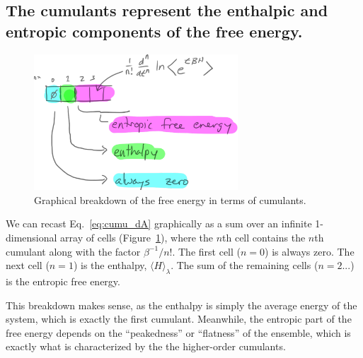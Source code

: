 \documentclass{article}
\begin{document}
\subsection{The cumulants represent the enthalpic and entropic components of the free energy.}

\begin{figure}[tb]
\centering
\includegraphics[width=3in]{figure1.pdf}
\caption{Graphical breakdown of the free energy in terms of cumulants.}
\label{fig:1D}
\end{figure}

We can recast Eq.~\ref{eq:cumu_dA} graphically as a sum over an infinite 1-dimensional array of cells (Figure~\ref{fig:1D}), where the $n$th cell contains the $n$th cumulant along with the factor $\beta^{-1}/n!$. The first cell ($n=0$) is always zero. The next cell ($n=1$) is the enthalpy, $\langle H \rangle_\lambda$. The sum of the remaining cells ($n=2...$) is the entropic free energy.

This breakdown makes sense, as the enthalpy is simply the average energy of the system, which is exactly the first cumulant. Meanwhile, the entropic part of the free energy depends on the ``peakedness'' or ``flatness'' of the ensemble, which is exactly what is characterized by the the higher-order cumulants.

\end{document}
